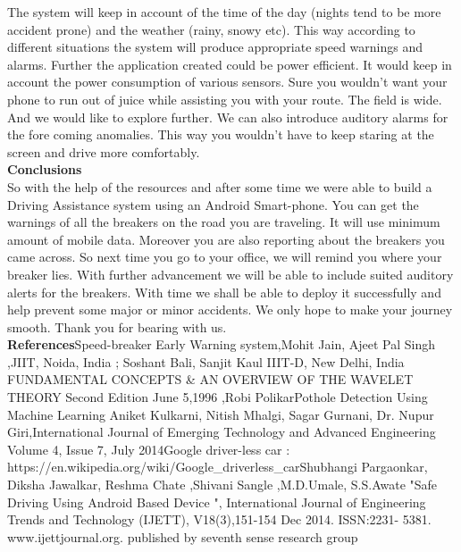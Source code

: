 \documentclass[12pt]{report}
\begin{document}
The system will keep in account of the time of the day (nights tend to be more accident prone) and the weather (rainy, snowy etc). This way according to different situations the system will produce appropriate speed warnings and alarms.
Further the application created could be power efficient. It would keep in account the power consumption of various sensors. Sure you wouldn't want your phone to run out of juice while assisting you with your route.
The field is wide. And we would like to explore further. We can also introduce auditory alarms for the fore coming anomalies. This way you wouldn't have to keep staring at the screen and drive more comfortably.\\
\textbf{Conclusions}\\
So with the help of the resources and after some time we were able to build a Driving Assistance system using an Android Smart-phone. You can get the warnings of all the breakers on the road you are traveling. It will use minimum amount of mobile data. Moreover you are also reporting about the breakers you came across. So next time you go to your office, we will remind you where your breaker lies.
With further advancement we will be able to include suited auditory alerts for the breakers.
With time we shall be able to deploy it successfully and help prevent some major or minor accidents. We only hope to make your journey smooth. Thank you for bearing with us.\\
\textbf{References}\newline
[1]	Speed-breaker Early Warning system,Mohit Jain, Ajeet Pal Singh ,JIIT, Noida, India ; 	Soshant Bali, Sanjit Kaul IIIT-D, New Delhi, India \newline
[2]	FUNDAMENTAL CONCEPTS \& AN OVERVIEW OF THE WAVELET THEORY 
	Second Edition June 5,1996 ,Robi Polikar\newline
[3]	Pothole Detection Using Machine Learning Aniket Kulkarni, 	Nitish Mhalgi, Sagar 	Gurnani, Dr. Nupur Giri,International 	Journal of Emerging Technology and Advanced 	Engineering Volume 4, Issue 7, July 2014\newline
[4]	Google driver-less car : https://en.wikipedia.org/wiki/Google\_driverless\_car\newline
[5]	Shubhangi Pargaonkar, Diksha Jawalkar, Reshma Chate ,Shivani Sangle ,M.D.Umale, 	S.S.Awate "Safe 	Driving Using Android Based Device ", International Journal of 	Engineering Trends and Technology (IJETT), 	V18(3),151-154 Dec 2014. ISSN:2231-	5381. www.ijettjournal.org. published by seventh sense research group \newline
\end{document}
